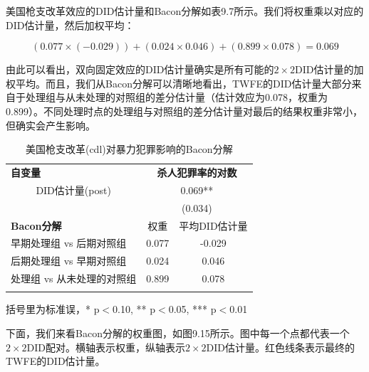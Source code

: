 \documentclass[cn,12pt,math=newtx,citestyle=gb7714-2015,bibstyle=gb7714-2015]{elegantbook}
\begin{document}
    美国枪支改革效应的DID估计量和Bacon分解如表9.7所示。我们将权重乘以对应的DID估计量，然后加权平均：
    
    $$(0.077 \times (-0.029)) + (0.024 \times 0.046) + (0.899 \times 0.078) = 0.069$$
    
    由此可以看出，双向固定效应的DID估计量确实是所有可能的$2 \times 2$DID估计量的加权平均。而且，我们从Bacon分解可以清晰地看出，TWFE的DID估计量大部分来自于处理组与从未处理的对照组的差分估计量（估计效应为0.078，权重为0.899）。不同处理时点的处理组与对照组的差分估计量对最后的结果权重非常小，但确实会产生影响。
    
    	\begin{table}[htbp]\centering
    	\scriptsize
    	\caption{美国枪支改革(cdl)对暴力犯罪影响的Bacon分解}
    	\label{DID_2}
    	\begin{center}
    		\begin{threeparttable}
    			\begin{tabular}{l*{2}{c}}
    				\toprule
    				\multicolumn{1}{l}{\textbf{自变量}}&
    				\multicolumn{2}{c}{\textbf{杀人犯罪率的对数}}\\
    				\multicolumn{1}{c}{DID估计量(post)}&
    				\multicolumn{2}{c}{0.069**} \\
    				\multicolumn{1}{c}{}& 
    				\multicolumn{2}{c}{(0.034)}\\
    				\midrule
    				\textbf{Bacon分解} &权重&平均DID估计量\\
    				早期处理组 vs 后期对照组               &      0.077&-0.029      \\
    				后期处理组 vs 早期对照组 &   0.024   &    0.046   \\
    				处理组 vs 从未处理的对照组        &     0.899&0.078      \\
    				
    				\\
    				\bottomrule
    			\end{tabular}
    			\begin{tablenotes}
    				\tiny
    				\item 括号里为标准误，* p$<$0.10, ** p$<$0.05, *** p$<$0.01
    			\end{tablenotes}
    		\end{threeparttable}
    	\end{center}
    \end{table}
    
    下面，我们来看Bacon分解的权重图，如图9.15所示。图中每一个点都代表一个$2 \times 2$DID配对。横轴表示权重，纵轴表示$2 \times 2$DID估计量。红色线条表示最终的TWFE的DID估计量。
    
\end{document}
